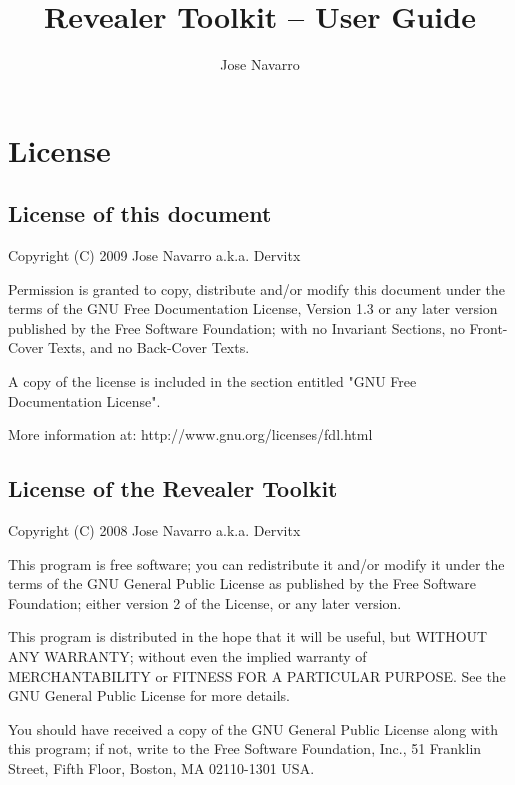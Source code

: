 \documentclass[a4paper,11pt,oneside]{report}
\title{Revealer Toolkit -- User Guide}
\author{Jose Navarro}
\begin{document}
\maketitle

\tableofcontents


\chapter{License}

\section{License of this document}

    Copyright (C) 2009 Jose Navarro a.k.a. Dervitx
    
    Permission is granted to copy, distribute and/or modify this document
    under the terms of the GNU Free Documentation License, Version 1.3
    or any later version published by the Free Software Foundation;
    with no Invariant Sections, no Front-Cover Texts, and no Back-Cover Texts.
    
    A copy of the license is included in the section entitled "GNU
    Free Documentation License".
    
    More information at: http://www.gnu.org/licenses/fdl.html

\section{License of the Revealer Toolkit}

	Copyright (C) 2008 Jose Navarro a.k.a. Dervitx

    This program is free software; you can redistribute it and/or modify
    it under the terms of the GNU General Public License as published by
    the Free Software Foundation; either version 2 of the License, or
    any later version.

    This program is distributed in the hope that it will be useful,
    but WITHOUT ANY WARRANTY; without even the implied warranty of
    MERCHANTABILITY or FITNESS FOR A PARTICULAR PURPOSE.  See the
    GNU General Public License for more details.

    You should have received a copy of the GNU General Public License along
    with this program; if not, write to the Free Software Foundation, Inc.,
    51 Franklin Street, Fifth Floor, Boston, MA 02110-1301 USA.
    
\end{document}
